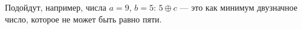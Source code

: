 \begin{itemize}
\itA {}

\itB {}

\itC Подойдут, например, числа $a=9$, $b=5$: $5 \oplus c$ — это как минимум двузначное число, которое не может быть равно пяти.
\end{itemize}